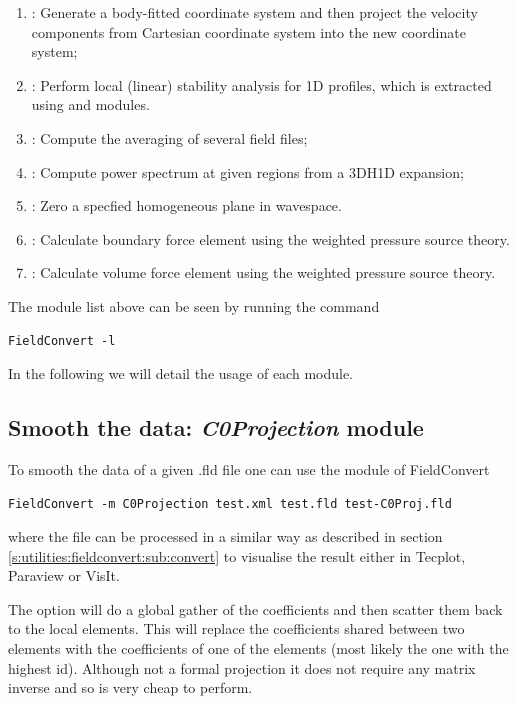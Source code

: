\begin{enumerate}
\item {}: Generate a body-fitted coordinate system and then  project the velocity components from Cartesian coordinate system into the new coordinate system;
\item {}: Perform local (linear) stability analysis for 1D profiles, which is extracted using  and  modules.
\item {}: Compute the averaging of several field files;
\item {}: Compute power spectrum at given regions from a 3DH1D expansion;
\item {}: Zero a specfied homogeneous plane in wavespace.
\item {}: Calculate boundary force element using the weighted pressure source theory.
\item {}: Calculate volume force element using the weighted pressure source theory.
\end{enumerate}
The module list above can be seen by running the command
%
\begin{lstlisting}[style=BashInputStyle]
FieldConvert -l
\end{lstlisting}
%
In the following we will detail the usage of each module.
%
%
%

\subsection{Smooth the data: \textit{C0Projection} module}
To smooth the data of a given .fld file one can
use the  module of FieldConvert
%
\begin{lstlisting}[style=BashInputStyle]
FieldConvert -m C0Projection test.xml test.fld test-C0Proj.fld
\end{lstlisting}
%
where the file  can be processed in a similar
way as described in section \ref{s:utilities:fieldconvert:sub:convert}
to visualise the result either in Tecplot, Paraview or VisIt.

The option  will do a global gather of the
coefficients and then scatter them back to the local elements. This
will replace the coefficients shared between two elements with the
coefficients of one of the elements (most likely the one with the
highest id). Although not a formal projection it does not require any
matrix inverse and so is very cheap to perform.

